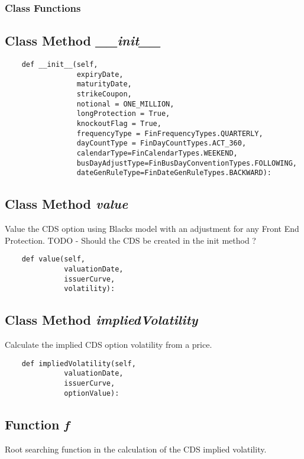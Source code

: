 \documentclass[twoside,11pt]{book}
\begin{document}
\subsubsection{Class Functions}

\subsection{Class Method {\it \_\_init\_\_}}


\begin{lstlisting}
    def __init__(self, 
                 expiryDate,
                 maturityDate,
                 strikeCoupon,
                 notional = ONE_MILLION,
                 longProtection = True,
                 knockoutFlag = True,
                 frequencyType = FinFrequencyTypes.QUARTERLY,
                 dayCountType = FinDayCountTypes.ACT_360,
                 calendarType=FinCalendarTypes.WEEKEND,
                 busDayAdjustType=FinBusDayConventionTypes.FOLLOWING,
                 dateGenRuleType=FinDateGenRuleTypes.BACKWARD):
\end{lstlisting}

\subsection{Class Method {\it value}}
Value the CDS option using Blacks model with an adjustment for any Front End Protection. TODO - Should the CDS be created in the init method ? 

\begin{lstlisting}
    def value(self, 
              valuationDate,
              issuerCurve,
              volatility):
\end{lstlisting}

\subsection{Class Method {\it impliedVolatility}}
Calculate the implied CDS option volatility from a price. 

\begin{lstlisting}
    def impliedVolatility(self,
              valuationDate,
              issuerCurve,
              optionValue):
\end{lstlisting}

\subsection{Function {\it f}}
Root searching function in the calculation of the CDS implied volatility. 
\end{document}
